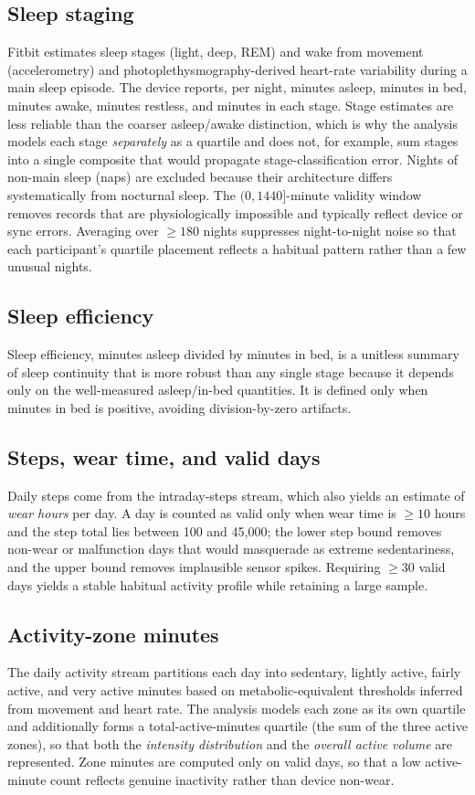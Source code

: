\documentclass[11pt]{article}
\begin{document}
\subsection{Sleep staging}
Fitbit estimates sleep stages (light, deep, REM) and wake from movement (accelerometry) and
photoplethysmography-derived heart-rate variability during a main sleep episode. The device reports, per
night, minutes asleep, minutes in bed, minutes awake, minutes restless, and minutes in each stage.
Stage estimates are less reliable than the coarser asleep/awake distinction, which is why the analysis
models each stage \emph{separately} as a quartile and does not, for example, sum stages into a single
composite that would propagate stage-classification error. Nights of non-main sleep (naps) are excluded
because their architecture differs systematically from nocturnal sleep. The $(0, 1440]$-minute validity
window removes records that are physiologically impossible and typically reflect device or sync errors.
Averaging over $\geq 180$ nights suppresses night-to-night noise so that each participant's quartile
placement reflects a habitual pattern rather than a few unusual nights.

\subsection{Sleep efficiency}
Sleep efficiency, minutes asleep divided by minutes in bed, is a unitless summary of sleep continuity
that is more robust than any single stage because it depends only on the well-measured asleep/in-bed
quantities. It is defined only when minutes in bed is positive, avoiding division-by-zero artifacts.

\subsection{Steps, wear time, and valid days}
Daily steps come from the intraday-steps stream, which also yields an estimate of \emph{wear hours} per
day. A day is counted as valid only when wear time is $\geq 10$ hours and the step total lies between
100 and 45{,}000; the lower step bound removes non-wear or malfunction days that would masquerade as
extreme sedentariness, and the upper bound removes implausible sensor spikes. Requiring $\geq 30$ valid
days yields a stable habitual activity profile while retaining a large sample.

\subsection{Activity-zone minutes}
The daily activity stream partitions each day into sedentary, lightly active, fairly active, and very
active minutes based on metabolic-equivalent thresholds inferred from movement and heart rate. The
analysis models each zone as its own quartile and additionally forms a total-active-minutes quartile
(the sum of the three active zones), so that both the \emph{intensity distribution} and the
\emph{overall active volume} are represented. Zone minutes are computed only on valid days, so that a
low active-minute count reflects genuine inactivity rather than device non-wear.
\end{document}
